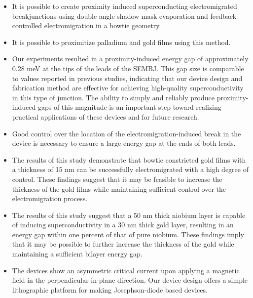 \begin{itemize}

\item It is possible to create proximity induced superconducting electromigrated breakjunctions using double angle shadow mask evaporation and feedback controlled electromigration in a bowtie geometry.

\item It is possible to proximitize palladium and gold films using this method.

\item Our experiments resulted in a proximity-induced energy gap of approximately 0.28 meV at the tips of the leads of the SEMBJ. This gap size is comparable to values reported in previous studies, indicating that our device design and fabrication method are effective for achieving high-quality superconductivity in this type of junction. The ability to simply and reliably produce proximity-induced gaps of this magnitude is an important step toward realizing practical applications of these devices and for future research.

\item Good control over the location of the electromigration-induced break in the device is necessary to ensure a large energy gap at the ends of both leads.

\item The results of this study demonstrate that bowtie constricted gold films with a thickness of 15 nm can be successfully electromigrated with a high degree of control. These findings suggest that it may be feasible to increase the thickness of the gold films while maintaining sufficient control over the electromigration process.

\item The results of this study suggest that a 50 nm thick niobium layer is capable of inducing superconductivity in a 30 nm thick gold layer, resulting in an energy gap within one percent of that of pure niobium. These findings imply that it may be possible to further increase the thickness of the gold while maintaining a sufficient bilayer energy gap.

\item The devices show an asymmetric critical current upon applying a magnetic field in the perpendicular in-plane direction. Our device design offers a simple lithographic platform for making Josephson-diode based devices.

\end{itemize}






